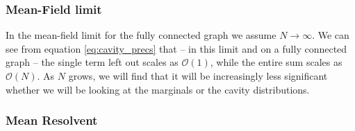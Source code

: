 \documentclass[../main.tex]{subfiles}
\begin{document}
\subsubsection{Mean-Field limit}

In the mean-field limit for the fully connected graph we assume $N \to \infty$.
We can see from equation \eqref{eq:cavity_precs} that -- in this limit and on a fully connected graph -- the single term left out scales as $\mathcal{O}(1)$, while the entire sum scales as $\mathcal{O}(N)$.
As $N$ grows, we will find that it will be increasingly less significant whether we will be looking at the marginals or the cavity distributions.

\subsubsection{Mean Resolvent}



\ifSubfilesClassLoaded{
}{
    \newpage
}
\end{document}
